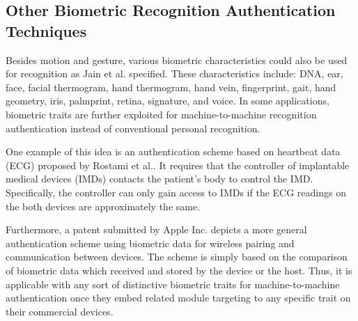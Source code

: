 
\subsection{Other Biometric Recognition Authentication Techniques}

Besides motion and gesture, various biometric characteristics could also be used for recognition as Jain et al. \cite{Jain} specified. These characteristics include: DNA, ear, face, facial thermogram, hand thermogram, hand vein, fingerprint, gait, hand geometry, iris, palmprint, retina, signature, and voice. In some applications, biometric traits are further exploited for machine-to-machine recognition authentication instead of conventional personal recognition.

One example of this idea is an authentication scheme based on heartbeat data (ECG) proposed by Rostami et al.\cite{Rostami:2013}. It requires that the controller of implantable medical devices (IMDs) contacts the patient's body to control the IMD. Specifically, the controller can only gain access to IMDs if the ECG readings on the both devices are approximately the same.  
 
Furthermore, a patent \cite{Apple:2014} submitted by Apple Inc. depicts a more general authentication scheme using biometric data for wireless pairing and communication between devices. The scheme is simply based on the comparison of biometric data which received and stored by the device or the host. Thus, it is applicable with any sort of distinctive biometric traits for machine-to-machine authentication once they embed related module targeting to any specific trait on their commercial devices.   